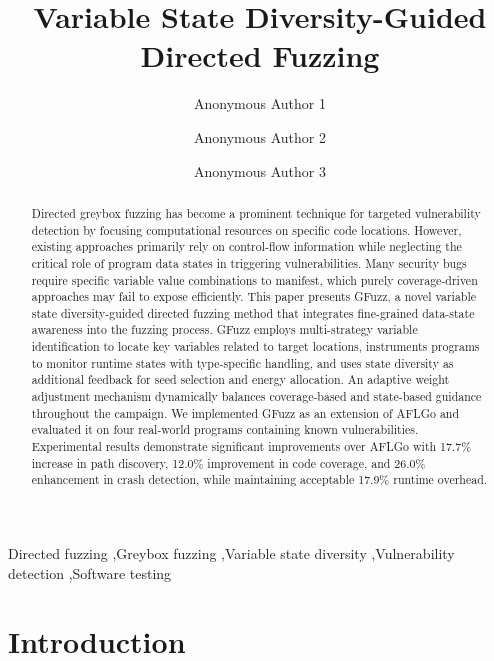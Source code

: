 \documentclass[review]{elsarticle}
\begin{document}
\begin{frontmatter}

\title{Variable State Diversity-Guided Directed Fuzzing}

\author[inst1]{Anonymous Author 1}
\author[inst1]{Anonymous Author 2}
\author[inst2]{Anonymous Author 3}

\address[inst1]{Department of Computer Science, University A, City, Country}
\address[inst2]{School of Software Engineering, University B, City, Country}

\begin{abstract}
Directed greybox fuzzing has become a prominent technique for targeted vulnerability detection by focusing computational resources on specific code locations. However, existing approaches primarily rely on control-flow information while neglecting the critical role of program data states in triggering vulnerabilities. Many security bugs require specific variable value combinations to manifest, which purely coverage-driven approaches may fail to expose efficiently. This paper presents GFuzz, a novel variable state diversity-guided directed fuzzing method that integrates fine-grained data-state awareness into the fuzzing process. GFuzz employs multi-strategy variable identification to locate key variables related to target locations, instruments programs to monitor runtime states with type-specific handling, and uses state diversity as additional feedback for seed selection and energy allocation. An adaptive weight adjustment mechanism dynamically balances coverage-based and state-based guidance throughout the campaign. We implemented GFuzz as an extension of AFLGo and evaluated it on four real-world programs containing known vulnerabilities. Experimental results demonstrate significant improvements over AFLGo with 17.7\% increase in path discovery, 12.0\% improvement in code coverage, and 26.0\% enhancement in crash detection, while maintaining acceptable 17.9\% runtime overhead.
\end{abstract}

\begin{keyword}
Directed fuzzing \sep Greybox fuzzing \sep Variable state diversity \sep Vulnerability detection \sep Software testing
\end{keyword}

\end{frontmatter}

\linenumbers

\section{Introduction}
\label{sec:introduction}
\end{document}
